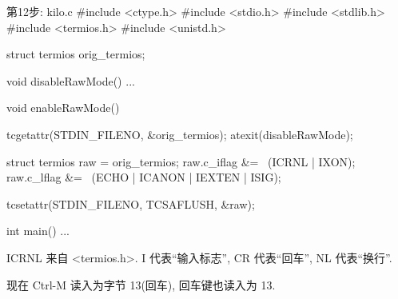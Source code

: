 \documentclass[lang=cn,newtx,10pt,scheme=chinese]{elegantbook}
\begin{document}
\begin{mycode}{第12步: kilo.c}
#include <ctype.h>
#include <stdio.h>
#include <stdlib.h>
#include <termios.h>
#include <unistd.h>

struct termios orig_termios;

void disableRawMode() { ... }

void enableRawMode() {
  tcgetattr(STDIN_FILENO, &orig_termios);
  atexit(disableRawMode);

  struct termios raw = orig_termios;
  raw.c_iflag &= ~(ICRNL | IXON);
  raw.c_lflag &= ~(ECHO | ICANON | IEXTEN | ISIG);

  tcsetattr(STDIN_FILENO, TCSAFLUSH, &raw);
}

int main() { ... }
\end{mycode}

ICRNL 来自 <termios.h>. I 代表``输入标志'', CR 代表``回车'', NL 代表``换行''.

现在 Ctrl-M 读入为字节 13(回车), 回车键也读入为 13.
\end{document}
